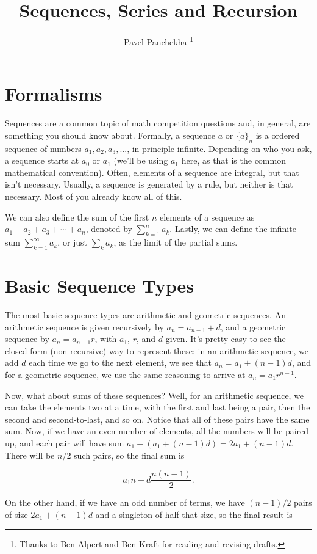 \documentclass[12pt,letterpaper]{article}
\author{Pavel Panchekha \thanks{Thanks to Ben Alpert and Ben Kraft for reading and revising drafts.}}
\title{Sequences, Series and Recursion}
\begin{document}
\maketitle

\section{Formalisms}
Sequences are a common topic of math competition questions and, in
general, are something you should know about. Formally, a sequence $a$ or
$\{a\}_n$ is a ordered sequence of numbers $a_1, a_2, a_3, ...$, in
principle infinite. Depending on who you ask, a sequence starts at
$a_0$ or $a_1$ (we'll be using $a_1$ here, as that is the common
mathematical convention). Often, elements of a sequence are integral,
but that isn't necessary. Usually, a sequence is generated by a rule,
but neither is that necessary. Most of you already know all of this.

We can also define the sum of the first $n$ elements of a sequence as
$a_1 + a_2 + a_3 + \cdots + a_n$, denoted by $\sum_{k=1}^n a_k$.
Lastly, we can define the infinite sum $\sum_{k=1}^\infty a_k$, or
just $\sum_k a_k$, as the limit of the partial sums.

\section{Basic Sequence Types}
The most basic sequence types are arithmetic and geometric sequences.
An arithmetic sequence is given recursively by $a_n = a_{n-1} + d$,
and a geometric sequence by $a_n = a_{n-1} r$, with $a_1$, $r$, and
$d$ given. It's pretty easy to see the closed-form (non-recursive) way
to represent these: in an arithmetic sequence, we add $d$
each time we go to the next element, we see that $a_n = a_1 + (n - 1)
d$, and for a geometric sequence, we use the same reasoning to arrive
at $a_n = a_1 r^{n - 1}$.

Now, what about sums of these sequences? Well, for an arithmetic
sequence, we can take the elements two at a time, with the first and
last being a pair, then the second and second-to-last, and so
on. Notice that all of these pairs have the same sum. Now, if we have
an even number of elements, all the numbers will be paired up, and each pair will have
sum $a_1 + (a_1 + (n - 1) d) = 2 a_1 + (n - 1) d$. There will be
$n/2$ such pairs, so the final sum is

$$a_1 n + d \frac{n (n-1)}{2}.$$

On the other hand, if we have an odd number of terms, we have
$(n-1)/2$ pairs of size $2 a_1 + (n - 1) d$ and a singleton of
half that size, so the final result is
\end{document}
